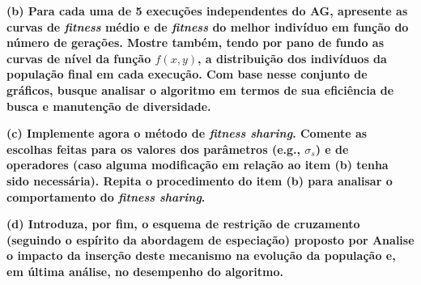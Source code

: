 \documentclass[a4paper, 12pt]{article}
\newcommand{\fitness}{\textit{fitness}\xspace}
\newcommand{\fitsha}{\textit{fitness sharing}\xspace}
\begin{document}
\textbf{(b) Para cada uma de 5 execuções independentes do AG, apresente as curvas de \fitness médio e de \fitness do melhor indivíduo em função do número de gerações. Mostre também, tendo por pano de fundo as curvas de nível da função $f(x, y)$, a distribuição dos indivíduos da população final em cada execução. Com base nesse conjunto de gráficos, busque analisar o algoritmo em termos de sua eficiência de busca e manutenção de diversidade.}

\textbf{(c) Implemente agora o método de \fitsha. Comente as escolhas feitas para os valores dos parâmetros (e.g., $\sigma_s$) e de operadores (caso alguma modificação em relação ao item (b) tenha sido necessária). Repita o procedimento do item (b) para analisar o comportamento do \fitsha.}

\textbf{(d) Introduza, por fim, o esquema de restrição de cruzamento (seguindo o espírito da abordagem de especiação) proposto por \cite{deb1989genetic} Analise o impacto da inserção deste mecanismo na evolução da população e, em última análise, no desempenho do algoritmo.}

\clearpage





 
\end{document}
